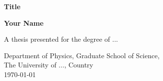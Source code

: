 \begin{titlepage}
    \begin{center}
        \vspace*{1cm}

        \textbf{\LARGE Title}

        \vspace{0.5cm}

        \vspace{1.5cm}

        \textbf{\LARGE Your Name}

        \vfill

        \Large
        A thesis presented for the degree of ...


        Department of Physics, Graduate School of Science,\\
        The University of ..., Country\\
        \today

    \end{center}
\end{titlepage}